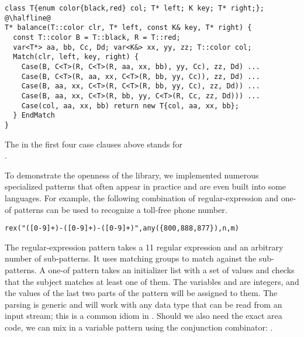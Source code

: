 \begin{lstlisting}
class T{enum color{black,red} col; T* left; K key; T* right;};
@\halfline@
T* balance(T::color clr, T* left, const K& key, T* right) {
  const T::color B = T::black, R = T::red;
  var<T*> aa, bb, Cc, Dd; var<K&> xx, yy, zz; T::color col;
  Match(clr, left, key, right) {
    Case(B, C<T>(R, C<T>(R, aa, xx, bb), yy, Cc), zz, Dd) ...
    Case(B, C<T>(R, aa, xx, C<T>(R, bb, yy, Cc)), zz, Dd) ...
    Case(B, aa, xx, C<T>(R, C<T>(R, bb, yy, Cc), zz, Dd)) ...
    Case(B, aa, xx, C<T>(R, bb, yy, C<T>(R, Cc, zz, Dd))) ...
    Case(col, aa, xx, bb) return new T{col, aa, xx, bb};
  } EndMatch
}
\end{lstlisting}

\noindent
The  in the first four case clauses above stands for \\ %
. %

To demonstrate the openness of the library, we implemented numerous 
specialized patterns that often appear in practice and are even built into some 
languages. For example, the following combination of regular-expression and one-of 
patterns can be used to recognize a toll-free phone number. 

\begin{lstlisting}
rex("([0-9]+)-([0-9]+)-([0-9]+)",any({800,888,877}),n,m)
\end{lstlisting}

\noindent
The regular-expression pattern takes a \Cpp{}11 regular expression and an 
arbitrary number of sub-patterns. It uses matching groups to match against 
the sub-patterns. A one-of pattern takes an initializer list with a set of 
values and checks that the subject matches at least one of them. The variables 
 and  are integers, and the values of the last two parts of the pattern will be assigned to them. The parsing is generic 
and will work with any data type that can be read from an input stream; this is a 
common idiom in \Cpp{}. Should we also need the exact area code, we can mix in a 
variable pattern using the conjunction combinator: .

